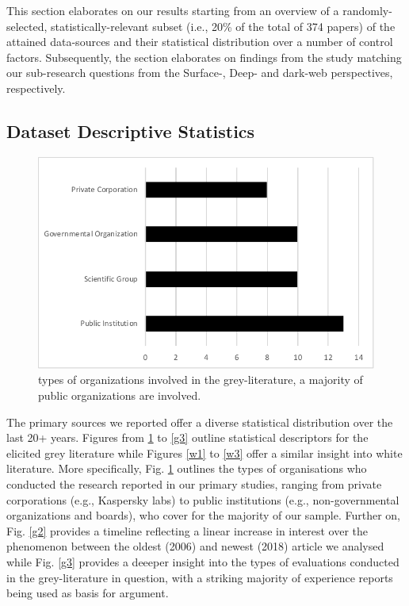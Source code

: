 This section elaborates on our results starting from an overview of a randomly-selected, statistically-relevant subset (i.e., 20\% of the total of 374 papers) of the attained data-sources and their statistical distribution over a number of control factors. Subsequently, the section elaborates on findings from the study matching our sub-research questions from the Surface-, Deep- and dark-web perspectives, respectively.

\subsection{Dataset Descriptive Statistics}

\begin{figure}
\begin{center}
\includegraphics[scale=0.7]{./img/gcorptype}
\end{center}
\caption{types of organizations involved in the grey-literature, a majority of public organizations are involved.}\label{g1}
\end{figure}

The primary sources we reported offer a diverse statistical distribution over the last 20+ years. Figures from \ref{g1} to \ref{g3} outline statistical descriptors for the elicited grey literature while Figures \ref{w1} to \ref{w3} offer a similar insight into white literature. More specifically, Fig. \ref{g1} outlines the types of organisations who conducted the research reported in our primary studies, ranging from private corporations (e.g., Kaspersky labs) to public institutions (e.g., non-governmental organizations and boards), who cover for the majority of our sample. Further on, Fig. \ref{g2} provides a timeline reflecting a linear increase in interest over the phenomenon between the oldest (2006) and newest (2018) article we analysed while Fig. \ref{g3} provides a deeeper insight into the types of evaluations conducted in the grey-literature in question, with a striking majority of experience reports being used as basis for argument.


